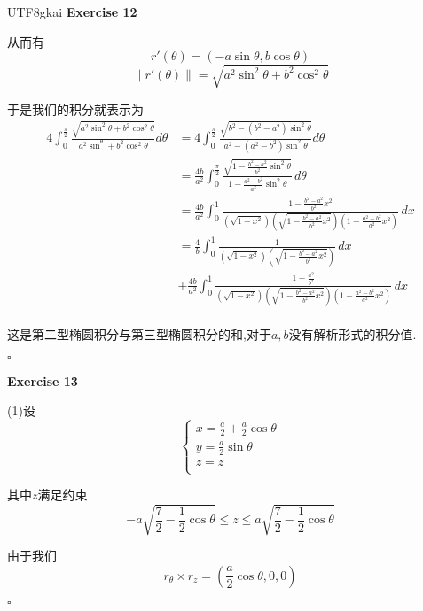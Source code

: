 \documentclass[11pt,hyperref,a4paper,UTF8]{ctexart}
\newenvironment{exercise}[1]{%
{\textbf{Exercise #1} \\ 
    }
}{
  \hfill $\square$ 
  \par\bigskip 
}
\newcommand{\parameter}[1]{\left(#1\right)}
\newcommand{\bracket}[1]{\left[#1\right]}
\begin{document}
\begin{CJK}{UTF8}{gkai}
\begin{exercise}{12}
    从而有
    \[r'(\theta) = (-a\sin \theta,b\cos\theta)\]
    \[\|r'(\theta)\| = \sqrt{a^2 \sin^2 \theta + b^2 \cos^2 \theta}\]

    于是我们的积分就表示为
    \[
    \begin{aligned}
        4\int_{0}^{\frac{\pi}{2}} \frac{\sqrt{a^2 \sin^2 \theta + b^2 \cos^2 \theta}}{a^2 \sin^\theta + b^2 \cos^2 \theta}d\theta &= 4\int_{0}^{\frac{\pi}{2}} \frac{\sqrt{b^2 - (b^2 - a^2)\sin^2 \theta}}{a^2  - (a^2 - b^2) \sin^2\theta}d\theta\\
        &= \frac{4b}{a^2}\int_{0}^{\frac{\pi}{2}}\frac{\sqrt{1 - \frac{b^2 - a^2}{b^2} \sin^2 \theta}}{1 - \frac{a^2 - b^2}{a^2}\sin^2\theta}\, d\theta\\
        &= \frac{4b}{a^2}\int_{0}^{1}\frac{1 - \frac{b^2 - a^2}{b^2} x^2}{\parameter{\sqrt{1 - x^2}}\parameter{\sqrt{1 - \frac{b^2 - a^2}{b^2} x^2}}\parameter{1 - \frac{a^2 - b^2}{a^2}x^2}}\, dx\\
        &= \frac{4}{b}\int_{0}^{1} \frac{1}{\parameter{\sqrt{1 - x^2}}\parameter{\sqrt{1 - \frac{b^2 - a^2}{b^2} x^2}}}\, dx\\ &+ \frac{4b}{a^2}\int_{0}^{1}\frac{1 - \frac{a^2}{b^2}}{\parameter{\sqrt{1 - x^2}}\parameter{\sqrt{1 - \frac{b^2 - a^2}{b^2} x^2}}\parameter{1 - \frac{a^2 - b^2}{a^2}x^2}} \, dx\\
    \end{aligned}    
    \]
    
    这是第二型椭圆积分与第三型椭圆积分的和,对于$a,b$没有解析形式的积分值.
\end{exercise}

\begin{exercise}{13}
    (1)设
    \[\begin{cases}
        x = \frac{a}{2} + \frac{a}{2} \cos \theta\\
        y = \frac{a}{2} \sin \theta\\
        z = z\\
    \end{cases}\]


    其中$z$满足约束
    \[- a \sqrt{\frac{7}{2}- \frac{1}{2}\cos\theta } \leq z \leq a \sqrt{\frac{7}{2}- \frac{1}{2}\cos\theta}\]

    由于我们
    \[r_\theta \times r_z = (\frac{a}{2}\cos \theta,0,0)\]


\end{exercise}
\end{CJK}
\end{document}
